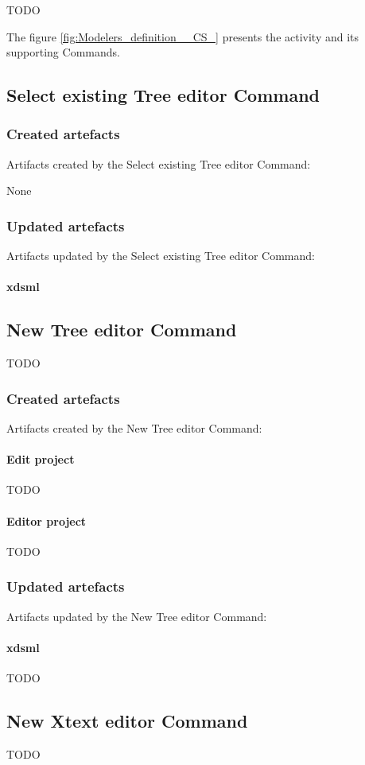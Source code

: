 \documentclass{gemoc} %
\begin{document}
TODO

The figure \ref{fig:Modelers_definition__CS_} presents the activity and its supporting Commands.

\subsection{Select existing Tree editor Command}

\subsubsection{Created artefacts}
Artifacts created by the Select existing Tree editor Command:

	None
\subsubsection{Updated artefacts}
Artifacts updated by the Select existing Tree editor Command:
\paragraph{xdsml} 


\subsection{New Tree editor Command}
TODO
\subsubsection{Created artefacts}
Artifacts created by the New Tree editor Command:
\paragraph{Edit project} 
TODO\paragraph{Editor project} 
TODO
\subsubsection{Updated artefacts}
Artifacts updated by the New Tree editor Command:
\paragraph{xdsml} 
TODO

\subsection{New Xtext editor Command}
TODO
\end{document}
